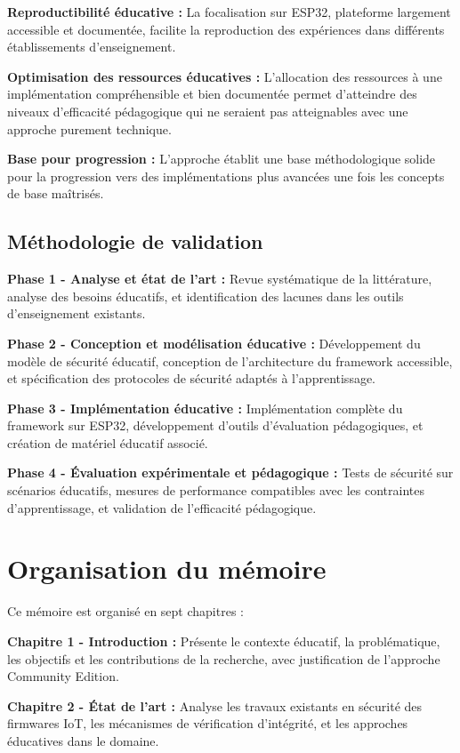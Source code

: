 \textbf{Reproductibilité éducative :} La focalisation sur ESP32, plateforme largement accessible et documentée, facilite la reproduction des expériences dans différents établissements d'enseignement.

\textbf{Optimisation des ressources éducatives :} L'allocation des ressources à une implémentation compréhensible et bien documentée permet d'atteindre des niveaux d'efficacité pédagogique qui ne seraient pas atteignables avec une approche purement technique.

\textbf{Base pour progression :} L'approche établit une base méthodologique solide pour la progression vers des implémentations plus avancées une fois les concepts de base maîtrisés.

\subsection{Méthodologie de validation}

\textbf{Phase 1 - Analyse et état de l'art :} Revue systématique de la littérature, analyse des besoins éducatifs, et identification des lacunes dans les outils d'enseignement existants.

\textbf{Phase 2 - Conception et modélisation éducative :} Développement du modèle de sécurité éducatif, conception de l'architecture du framework accessible, et spécification des protocoles de sécurité adaptés à l'apprentissage.

\textbf{Phase 3 - Implémentation éducative :} Implémentation complète du framework sur ESP32, développement d'outils d'évaluation pédagogiques, et création de matériel éducatif associé.

\textbf{Phase 4 - Évaluation expérimentale et pédagogique :} Tests de sécurité sur scénarios éducatifs, mesures de performance compatibles avec les contraintes d'apprentissage, et validation de l'efficacité pédagogique.

\section{Organisation du mémoire}

Ce mémoire est organisé en sept chapitres :

\textbf{Chapitre 1 - Introduction :} Présente le contexte éducatif, la problématique, les objectifs et les contributions de la recherche, avec justification de l'approche Community Edition.

\textbf{Chapitre 2 - État de l'art :} Analyse les travaux existants en sécurité des firmwares IoT, les mécanismes de vérification d'intégrité, et les approches éducatives dans le domaine.

